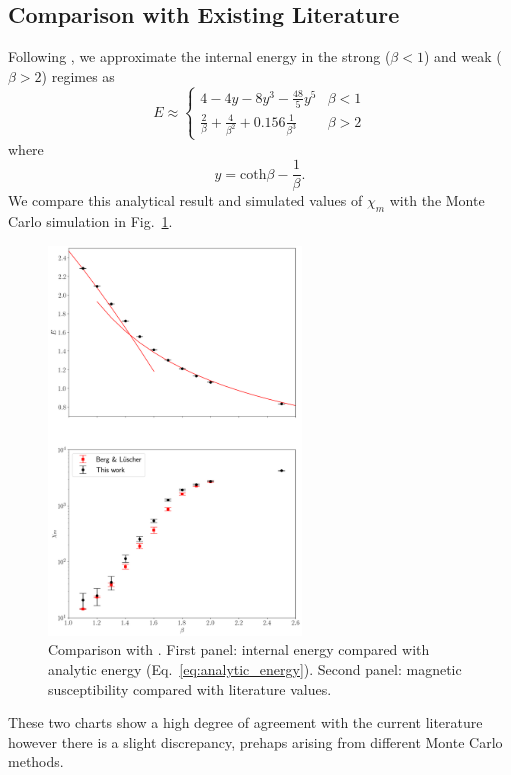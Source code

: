 \subsection{Comparison with Existing Literature}
Following \cite{berg1981}, we approximate the internal energy in the strong ($\beta<1$) and weak ($\beta>2$) regimes as 
\begin{equation}
    \label{eq:analytic_energy}
E \approx \begin{cases} 
    4-4y-8y^3-\frac{48}{5}y^5& \beta<1 \\
\frac{2}{\beta} + \frac{4}{\beta^2} + 0.156\frac{1}{\beta^3}& \beta>2
\end{cases}
\end{equation}
where 
\begin{equation}
    y=\mathrm{coth}\beta-\frac{1}{\beta}.
\end{equation}
We compare this analytical result and simulated values of $\chi_m$ with the Monte Carlo simulation in Fig.~\ref{fig:bergluscher}.
\begin{figure}[h!]
    \centering
      \includegraphics[width=0.6\textwidth]{imgs/internal_energy.png}
      \caption{\label{fig:bergluscher}Comparison with \cite{berg1981}. First panel: internal energy compared with analytic  energy (Eq.~\ref{eq:analytic_energy}). Second panel: magnetic susceptibility compared with literature values.}
\end{figure}
These two charts show a high degree of agreement with the current literature however there is a slight discrepancy, prehaps arising from different Monte Carlo methods.

